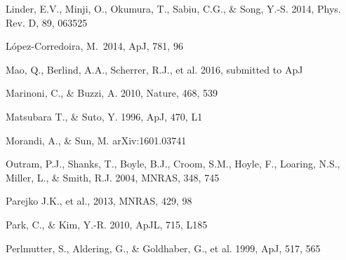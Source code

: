 \documentclass[iop]{emulateapj}
\begin{document}
\begin{thebibliography}{}

Linder, E.V., Minji, O., Okumura, T., Sabiu, C.G., \& Song, Y.-S. 2014, Phys. Rev. D, 89, 063525  

L{\'o}pez-Corredoira, M.\ 2014, ApJ, 781, 96 

Mao, Q., Berlind, A.A., Scherrer, R.J., et al. 2016, submitted to ApJ

Marinoni, C., \& Buzzi, A. 2010, Nature, 468, 539  

Matsubara T., \& Suto, Y. 1996, ApJ, 470, L1  



Morandi, A., \& Sun, M. arXiv:1601.03741


Outram, P.J., Shanks, T., Boyle, B.J., Croom, S.M., Hoyle, F., Loaring, N.S., 
Miller, L., \& Smith, R.J. 2004, MNRAS, 348, 745  

Parejko J.K., et al., 2013, MNRAS, 429, 98



Park, C., \& Kim, Y.-R. 2010, ApJL, 715, L185  





Perlmutter, S., Aldering, G., \& Goldhaber, G., et al. 1999, ApJ, 517, 565  


\end{thebibliography}
\end{document}
